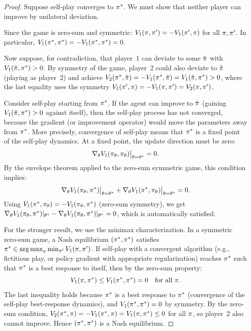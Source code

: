 \documentclass[11pt,a4paper]{article}
\begin{document}
\begin{proof}
Suppose self-play converges to $\pi^*$.  We must show that neither
player can improve by unilateral deviation.

Since the game is zero-sum and symmetric:
$V_1(\pi, \pi') = -V_1(\pi', \pi)$ for all
$\pi, \pi'$.  In particular,
$V_1(\pi^*, \pi^*) = -V_1(\pi^*, \pi^*) = 0$.

Now suppose, for contradiction, that player~1 can deviate to some
$\tilde{\pi}$ with $V_1(\tilde{\pi}, \pi^*) > 0$.  By
symmetry of the game, player~2 could also deviate to $\tilde{\pi}$
(playing as player~2) and achieve
$V_2(\pi^*, \tilde{\pi}) = -V_1(\pi^*, \tilde{\pi})
= V_1(\tilde{\pi}, \pi^*) > 0$,
where the last equality uses the symmetry
$V_1(\pi', \pi) = -V_1(\pi, \pi') = V_2(\pi, \pi')$.

Consider self-play starting from $\pi^*$.  If the agent can improve
to $\tilde{\pi}$ (gaining $V_1(\tilde{\pi}, \pi^*) > 0$
against itself), then the self-play process has not converged, because
the gradient (or improvement operator) would move the parameters away
from $\pi^*$.  More precisely, convergence of self-play means that
$\pi^*$ is a fixed point of the self-play dynamics.  At a fixed
point, the update direction must be zero:
\[
  \nabla_\theta V_1(\pi_\theta, \pi_\theta)\big|_{\theta = \theta^*}
  = 0.
\]
By the envelope theorem applied to the zero-sum symmetric game, this
condition implies:
\[
  \nabla_\theta V_1(\pi_\theta, \pi^*)\big|_{\theta = \theta^*}
  + \nabla_\theta V_1(\pi^*, \pi_\theta)\big|_{\theta = \theta^*}
  = 0.
\]
Using $V_1(\pi^*, \pi_\theta) = -V_1(\pi_\theta, \pi^*)$
(zero-sum symmetry), we get
$\nabla_\theta V_1(\pi_\theta, \pi^*)|_{\theta^*}
- \nabla_\theta V_1(\pi_\theta, \pi^*)|_{\theta^*} = 0$,
which is automatically satisfied.

For the stronger result, we use the minimax characterization.  In a
symmetric zero-sum game, a Nash equilibrium $(\pi^*, \pi^*)$
satisfies $\pi^* \in \operatorname{arg\,max}_\pi \min_{\pi'} V_1(\pi, \pi')$.
If self-play with a convergent algorithm (e.g., fictitious play, or
policy gradient with appropriate regularization) reaches $\pi^*$
such that $\pi^*$ is a best response to itself, then by the
zero-sum property:
\[
  V_1(\pi, \pi^*) \le V_1(\pi^*, \pi^*) = 0
  \quad \text{for all } \pi.
\]
The last inequality holds because $\pi^*$ is a best response to
$\pi^*$ (convergence of the self-play best-response dynamics),
and $V_1(\pi^*, \pi^*) = 0$ by symmetry.  By the zero-sum
condition, $V_2(\pi^*, \pi) = -V_1(\pi^*, \pi)
= V_1(\pi, \pi^*) \le 0$ for all $\pi$, so player~2 also
cannot improve.  Hence $(\pi^*, \pi^*)$ is a Nash equilibrium.
\end{proof}
\end{document}
